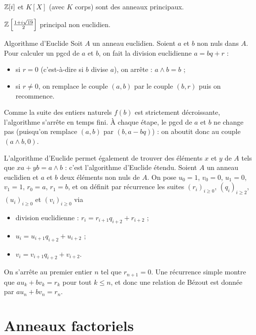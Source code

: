 \documentclass[]{report}
\begin{document}
\begin{cor}{}{}
    $\mathbb{Z}[i]$ et $K[X]$ (avec $K$ corps) sont des anneaux principaux.
\end{cor}

\begin{re}{}{}
    $\mathbb{Z}\left[\frac{1+i\sqrt{19}}{2}\right]$ principal non euclidien.
\end{re}

\begin{tm}{Algorithme d'Euclide}{}
    Soit $A$ un anneau euclidien. Soient $a$ et $b$ non nuls dans $A$. Pour calculer un pgcd de $a$ et $b$, on fait la division euclidienne $a = bq + r$ :
    \begin{itemize}
        \item si $r = 0$ (c'est-à-dire si $b$ divise $a$), on arrête : $a \wedge b = b$ ;
        \item si $r \neq 0$, on remplace le couple $(a, b)$ par le couple $(b, r)$ puis on recommence.
    \end{itemize}
    Comme la suite des entiers naturels $f(b)$ est strictement décroissante, l'algorithme s'arrête en temps fini. À chaque étape, le pgcd de $a$ et $b$ ne change pas (puisqu'on remplace $(a, b)$ par $(b, a - bq)$) : on aboutit donc au couple $(a \wedge b, 0)$.

    L'algorithme d'Euclide permet également de trouver des éléments $x$ et $y$ de $A$ tels que $xa + yb = a \wedge b$ : c'est l'algorithme d'Euclide étendu. Soient $A$ un anneau euclidien et $a$ et $b$ deux éléments non nuls de $A$. On pose $u_0 = 1$, $v_0 = 0$, $u_1 = 0$, $v_1 = 1$, $r_0 = a$, $r_1 = b$, et on définit par récurrence les suites $(r_i)_{i \ge 0}$, $(q_i)_{i \ge 2}$, $(u_i)_{i \ge 0}$ et $(v_i)_{i \ge 0}$ via
    \begin{itemize}
        \item[(i)] division euclidienne : $r_i = r_{i+1}q_{i+2} + r_{i+2}$ ;
        \item[(ii)] $u_i = u_{i+1}q_{i+2} + u_{i+2}$ ;
        \item[(iii)] $v_i = v_{i+1}q_{i+2} + v_{i+2}$.
    \end{itemize}
    On s'arrête au premier entier $n$ tel que $r_{n+1} = 0$. Une récurrence simple montre que $au_k + bv_k = r_k$ pour tout $k \le n$, et donc une relation de Bézout est donnée par $au_n + bv_n = r_n$.
\end{tm}

\section{Anneaux factoriels}
\end{document}
